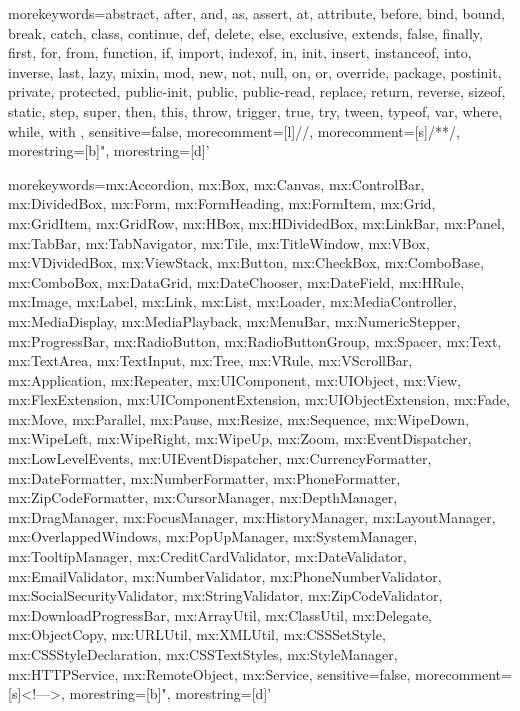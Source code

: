  {morekeywords={abstract, after, and, as, assert, at, attribute, before, bind, bound, break, catch, class, continue, def, delete, else, exclusive, extends, false, finally, first, for, from, function, if, import, indexof, in, init, insert, instanceof, into, inverse, last, lazy, mixin, mod, new, not, null, on, or, override, package, postinit, private, protected, public-init, public, public-read, replace, return, reverse, sizeof, static, step, super, then, this, throw, trigger, true, try, tween, typeof, var, where, while, with },
sensitive=false, morecomment=[l]{//}, morecomment=[s]{/*}{*/}, morestring=[b]", morestring=[d]'}

 {morekeywords={mx:Accordion, mx:Box, mx:Canvas, mx:ControlBar, mx:DividedBox, mx:Form, mx:FormHeading, mx:FormItem, mx:Grid, mx:GridItem, mx:GridRow, mx:HBox, mx:HDividedBox, mx:LinkBar, mx:Panel, mx:TabBar, mx:TabNavigator, mx:Tile, mx:TitleWindow, mx:VBox, mx:VDividedBox, mx:ViewStack, mx:Button, mx:CheckBox, mx:ComboBase, mx:ComboBox, mx:DataGrid, mx:DateChooser, mx:DateField, mx:HRule, mx:Image, mx:Label, mx:Link, mx:List, mx:Loader, mx:MediaController, mx:MediaDisplay, mx:MediaPlayback, mx:MenuBar, mx:NumericStepper, mx:ProgressBar, mx:RadioButton, mx:RadioButtonGroup, mx:Spacer, mx:Text, mx:TextArea, mx:TextInput, mx:Tree, mx:VRule, mx:VScrollBar, mx:Application, mx:Repeater, mx:UIComponent, mx:UIObject, mx:View, mx:FlexExtension, mx:UIComponentExtension, mx:UIObjectExtension, mx:Fade, mx:Move, mx:Parallel, mx:Pause, mx:Resize, mx:Sequence, mx:WipeDown, mx:WipeLeft, mx:WipeRight, mx:WipeUp, mx:Zoom, mx:EventDispatcher, mx:LowLevelEvents, mx:UIEventDispatcher, mx:CurrencyFormatter, mx:DateFormatter, mx:NumberFormatter, mx:PhoneFormatter, mx:ZipCodeFormatter, mx:CursorManager, mx:DepthManager, mx:DragManager, mx:FocusManager, mx:HistoryManager, mx:LayoutManager, mx:OverlappedWindows, mx:PopUpManager, mx:SystemManager, mx:TooltipManager, mx:CreditCardValidator, mx:DateValidator, mx:EmailValidator, mx:NumberValidator, mx:PhoneNumberValidator, mx:SocialSecurityValidator, mx:StringValidator, mx:ZipCodeValidator, mx:DownloadProgressBar, mx:ArrayUtil, mx:ClassUtil, mx:Delegate, mx:ObjectCopy, mx:URLUtil, mx:XMLUtil, mx:CSSSetStyle, mx:CSSStyleDeclaration, mx:CSSTextStyles, mx:StyleManager, mx:HTTPService, mx:RemoteObject, mx:Service},
sensitive=false, morecomment=[s]{<!--}{-->}, morestring=[b]", morestring=[d]'}


